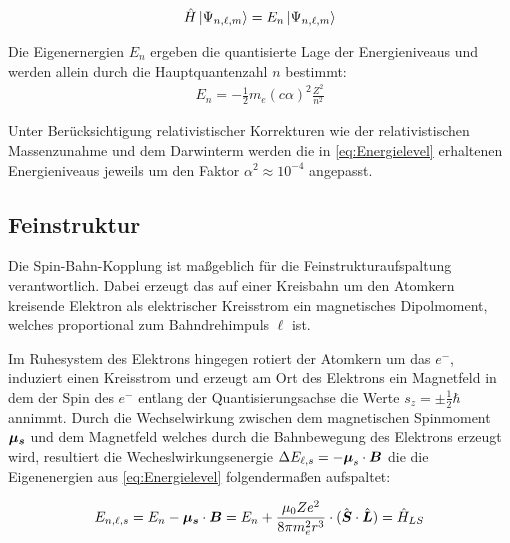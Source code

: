 \begin{align}
    \hat{H}\ket{\Psi_{n,\ell,m}}= E_{n}\ket{\Psi_{n,\ell,m}}
\end{align}

\noindent Die Eigenernergien ${E_{n}}$ ergeben die quantisierte Lage der Energieniveaus und werden allein durch die Hauptquantenzahl $n$ bestimmt:
\begin{align}
    E_{n} = - \frac{1}{2}m_{e}(c\alpha)^2\frac{Z^2}{n^2} \label{eq:Energielevel}
\end{align}

\noindent Unter Berücksichtigung relativistischer Korrekturen wie der relativistischen Massenzunahme und dem Darwinterm werden die in \eqref{eq:Energielevel} erhaltenen Energieniveaus jeweils um den Faktor $\alpha^2 \approx 10^{-4}$ angepasst. \cite{DemE4}\\

\subsection{Feinstruktur}

\noindent Die Spin-Bahn-Kopplung ist maßgeblich für die Feinstrukturaufspaltung verantwortlich. Dabei erzeugt das auf einer Kreisbahn um den Atomkern kreisende Elektron als elektrischer Kreisstrom ein magnetisches Dipolmoment, welches proportional zum Bahndrehimpuls $\ell$ ist.


\noindent Im Ruhesystem des Elektrons hingegen rotiert der Atomkern um das $e^{-}$, induziert einen Kreisstrom und erzeugt am Ort des Elektrons ein Magnetfeld in dem der Spin des $e^{-}$ entlang der Quantisierungsachse die Werte $s_{z} { = \pm \frac{1}{2}\hbar}$ annimmt. Durch die Wechselwirkung zwischen dem magnetischen Spinmoment $\boldsymbol{\mu_{s}}$ und dem Magnetfeld welches durch die Bahnbewegung des Elektrons erzeugt wird, resultiert die Wecheslwirkungsenergie $\Delta E_{\ell,s} = -\boldsymbol{\mu}_{s} \cdot \boldsymbol{B}$ die die Eigenenergien aus \eqref{eq:Energielevel} folgendermaßen aufspaltet:

\begin{align}
    E_{n,\ell,s} = E_{n}-\boldsymbol{\mu_{s}} \cdot \boldsymbol{B} = E_{n} + \frac{\mu_{0}Ze^2}{8\pi m_{e}^2r^{3}}\cdot (\hat{\boldsymbol{S}} \cdot \hat{\boldsymbol{L}}) = \hat{H}_{LS} \label{EnergieFS}
\end{align}


